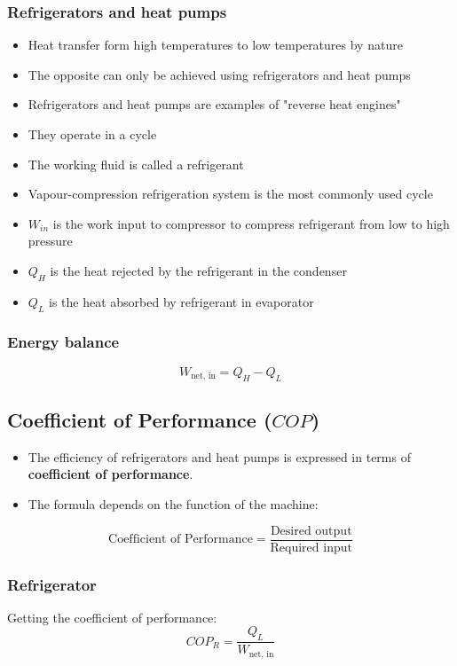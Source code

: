 \documentclass[11pt]{article}
\begin{document}
\subsubsection{Refrigerators and heat pumps}
\label{sec:org6b66c27}
\begin{itemize}
\item Heat transfer form high temperatures to low temperatures by nature
\item The opposite can only be achieved using refrigerators and heat pumps
\item Refrigerators and heat pumps are examples of "reverse heat engines"
\item They operate in a cycle
\item The working fluid is called a refrigerant
\item Vapour-compression refrigeration system is the most commonly used cycle
\item \(W_{in}\) is the work input to compressor to compress refrigerant from low to high pressure
\item \(Q_H\) is the heat rejected by the refrigerant in the condenser
\item \(Q_L\) is the heat absorbed by refrigerant in evaporator
\end{itemize}
\subsubsection{Energy balance}
\label{sec:org0dc422f}
\[W_{\text{net, in}} = Q_H - Q_L\]
\subsection{Coefficient of Performance (\(COP\))}
\label{sec:org8c071be}
\begin{itemize}
\item The efficiency of refrigerators and heat pumps is expressed in terms of \textbf{coefficient of performance}.
\item The formula depends on the function of the machine:
\end{itemize}
\[\text{Coefficient of Performance} = \frac{\text{Desired output}}{\text{Required input}}\]

 \newpage
\subsubsection{Refrigerator}
\label{sec:orga2536ee}
Getting the coefficient of performance:
\[COP_R = \frac{Q_L}{W_{\text{net, in}}}\]
\end{document}
